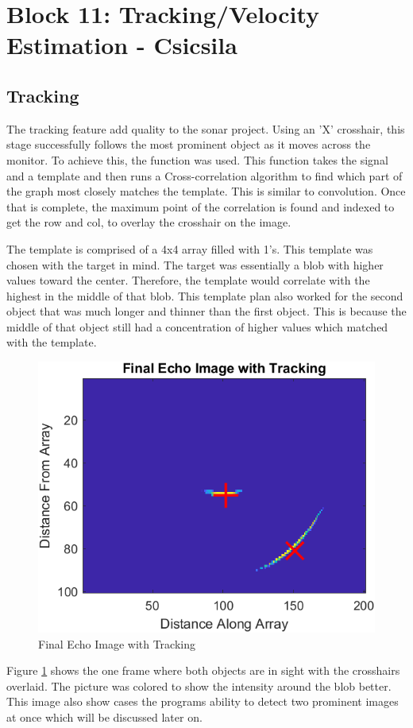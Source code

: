 
\section{Block 11: Tracking/Velocity Estimation - Csicsila}

\subsection{Tracking}
The tracking feature add quality to the sonar project. Using an 'X' crosshair, this stage successfully follows the most prominent object as it moves across the monitor. To achieve this, the  function was used. This function takes the signal and a template and then runs a Cross-correlation algorithm to find which part of the graph most closely matches the template. This is similar to convolution. Once that is complete, the maximum point of the correlation is found and indexed to get the row and col, to overlay the crosshair on the image. 

The template is comprised of a 4x4 array filled with 1's. This template was chosen with the target in mind. The target was essentially a blob with higher values toward the center. Therefore, the template would correlate with the highest in the middle of that blob. This template plan also worked for the second object that was much longer and thinner than the first object. This is because the middle of that object still had a concentration of higher values which matched with the template.

\begin{figure}[H]
    \centering
    \includegraphics[width=0.5\linewidth]{figures/TrackingImage2.png}
    \caption{Final Echo Image with Tracking}
    \label{fig:TrackingImage2}
\end{figure}

Figure \ref{fig:TrackingImage2} shows the one frame where both objects are in sight with the crosshairs overlaid. The picture was colored to show the intensity around the blob better. This image also show cases the programs ability to detect two prominent images at once which will be discussed later on. 

